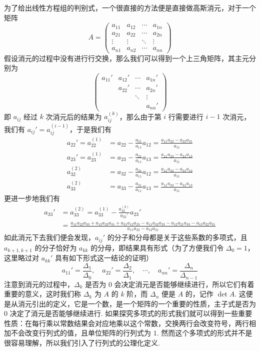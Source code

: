 为了给出线性方程组的判别式，一个很直接的方法便是直接做高斯消元，对于一个矩阵
\[
A = \begin{pmatrix}
    a_{11} & a_{12} & \cdots & a_{1n} \\
    a_{21} & a_{22} & \cdots & a_{2n} \\
    \vdots & \vdots & \ddots & \vdots \\
    a_{n1} & a_{n2} & \cdots & a_{nn}
\end{pmatrix}
\]
假设消元的过程中没有进行行交换，那么我们可以得到一个上三角矩阵，其主元分别为
\[
\begin{pmatrix}
    a_{11}' & a_{12}' & \cdots & a_{1n}' \\
            & a_{22}' & \cdots & a_{2n}' \\
            &         & \ddots & \vdots  \\
            &         &        & a_{nn}'
\end{pmatrix}
\]
即 $a_{ij}$ 经过 $k$ 次消元后的结果为 $a_{ij}^{(k)}$，那么由于第 $i$ 行需要进行 $i-1$ 次消元，我们有 $a_{ij}' = a_{ij}^{(i-1)}$，于是我们有
\begin{align*}
    a_{22}' = a_{22}^{(1)} &= a_{22} - \frac{a_{21}}{a_{11}}a_{12} = \frac{a_{11}a_{22}-a_{22}a_{21}}{a_{11}} \\
    a_{23}' = a_{23}^{(1)} &= a_{23} - \frac{a_{21}}{a_{11}}a_{13} = \frac{a_{11}a_{23}-a_{21}a_{13}}{a_{11}} \\
     a_{32}^{(2)} &= a_{32} - \frac{a_{31}}{a_{11}}a_{12} = \frac{a_{11}a_{32}-a_{31}a_{12}}{a_{11}} \\
     a_{33}^{(2)} &= a_{33} - \frac{a_{31}}{a_{11}}a_{13} = \frac{a_{11}a_{33}-a_{31}a_{13}}{a_{11}}
\end{align*}
更进一步地我们有
\begin{align*}
    a_{33}' &= a_{33}^{(2)} = a_{33}^{(1)} - \frac{a_{32}^{(2)}}{a_{22}'}a_{23}' \\
    &= \frac{a_{11}a_{22}a_{33} + a_{12}a_{23}a_{31}+a_{31}a_{12}a_{23}-a_{11}a_{32}a_{23}-a_{12}a_{21}a_{33} - a_{13}a_{22}a_{31}}{a_{11}a_{22}- a_{12}a_{21}}
\end{align*}
如此消元下去我们便会发现，$a_{ij}'$ 的分子和分母都是关于这些系数的多项式，且 $a_{k+1,k+1}$ 的分子恰好为 $a_{kk}$ 的分母，即结果具有形式（为了方便我们令 $\Delta_0 = 1$，这里略过对 $a_{kk}'$ 具有如下形式这一结论的证明）
\[
a_{11}' = \frac{\Delta_1}{\Delta_0},\quad a_{22}' = \frac{\Delta_2}{\Delta_1},\quad \cdots,\quad a_{nn}' = \frac{\Delta_n}{\Delta_{n-1}}
\]
注意到消元的过程中，$\Delta_k$ 是否为 $0$ 会决定消元是否能够继续进行，所以它们有着重要的意义，这时我们称 $\Delta_k$ 为 $A$ 的 $k$ 阶，而 $\Delta_n$ 便是 $A$ 的，记作 $\det A$. 这便是从消元引出的定义，它是一个数，是一个矩阵的一个重要的性质，主子式是否为 $0$ 决定了消元是否能够继续进行. 如果探究多项式的形式我们就可以得到一些重要性质：在每行乘以常数结果会对应地乘以这个常数，交换两行会改变符号，两行相加不会改变行列式的值，且单位矩阵的行列式为 $1$. 然而这个多项式的形式并不是很容易理解，所以我们引入了行列式的公理化定义.

